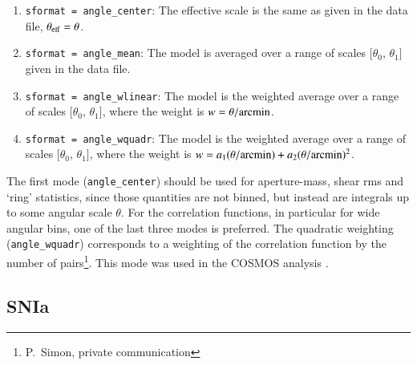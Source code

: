 \documentclass[11pt, chapterprefix, headsepline]{scrartcl}
\begin{document}
\begin{enumerate}

  \item  \texttt{sformat = angle\_center}: The effective scale is the
    same as given in the data file, $\theta_{\rm eff} = \theta$.

  \item \texttt{sformat = angle\_mean}: The model is averaged over a
    range of scales $[\theta_0$, $\theta_1]$ given in the data file.

  \item \texttt{sformat = angle\_wlinear}: The model is the 
    weighted average over a range of scales $[\theta_0$, $\theta_1]$,
    where the weight is $w = \theta/{\rm arcmin}$.

  \item \texttt{sformat = angle\_wquadr}: The model is the weighted
    average over a range of scales $[\theta_0$, $\theta_1]$, where the
    weight is $w = a_1 (\theta/{\rm arcmin}) + a_2 (\theta/{\rm
      arcmin})^2$.

\end{enumerate}

The first mode (\texttt{angle\_center}) should be used for
aperture-mass, shear rms and `ring' statistics, since those quantities
are not binned, but instead are integrals up to some angular scale
$\theta$. For the correlation functions, in particular for wide
angular bins, one of the last three modes is preferred. The quadratic
weighting (\texttt{angle\_wquadr}) corresponds to a weighting of the
correlation function by the number of pairs\footnote{P.~Simon, private
  communication}. This mode was used in the COSMOS analysis
\citep{SHJKS09}.


\subsection{SNIa}
\label{sec:snIa}
\end{document}
